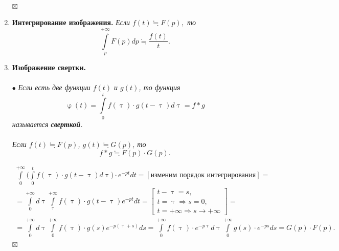 \documentclass[a4paper, 12pt]{article}
\newenvironment{Proof} %
{\par\noindent{$\blacklozenge$}} %
{\hfill$\scriptstyle\boxtimes$}
\renewcommand{\varphi}{\upvarphi}
\renewcommand{\tau}{\uptau}
\begin{document}
\begin{enumerate}
\begin{Proof}
\begin{multline*}
			\end{multline*}
		\end{Proof}
		\item \textbf{Интегрирование изображения.} \textit{Если $f(t) \fallingdotseq F(p),$ то} $$\int\limits_p^{+\infty}F(p)dp \fallingdotseq \dfrac{f(t)}{t}.$$
		\item \textbf{Изображение свертки.}\\\\
		$\bullet$ \textit{Если есть две функции $f(t)$ и $g(t)$, то функция $$\varphi(t) = \int\limits_0^t f(\tau)\cdot g(t-\tau) d\tau = f * g$$ называется \textbf{сверткой}.}\\\\
		\textit{Если $f(t) \fallingdotseq F(p)$, $g(t) \fallingdotseq G(p)$, то} $$f*g \fallingdotseq F(p)\cdot G(p).$$
		\begin{Proof}
			\begin{multline*}
				\int\limits_0^{+\infty}\Big(\int\limits_0^t f(\tau)\cdot g(t-\tau) d\tau \Big) \cdot e^{-pt} dt = [\text{изменим порядок интегрирования}] =\\=
				\int\limits_0^{+\infty}d\tau \int\limits_\tau^{+\infty} f(\tau)\cdot g(t-\tau)e^{-pt}dt = \left[\begin{gathered}
					t-\tau = s,\\
					t=\tau \Rightarrow s = 0,\\
					t = +\infty \Rightarrow s \to +\infty
				\end{gathered}\right] =\\ = \int\limits_0^{+\infty}d\tau \int\limits_0^{+\infty} f(\tau)\cdot g(s) e^{-p(\tau + s)} ds = \int\limits_0^{+\infty}f(\tau)\cdot e^{-p\tau}d\tau\int\limits_0^{+\infty}g(s)\cdot e^{-ps}ds = G(p)\cdot F(p).
			\end{multline*}
		\end{Proof}
	\end{enumerate} 
\end{document}
